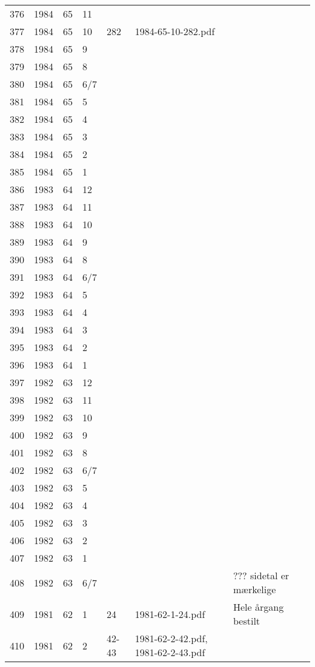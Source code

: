 \begin{longtable}{ |l|l|l|l|l|l|l| }
376 & 1984 & 65 & 11 &  &  &  \\
377 & 1984 & 65 & 10 & 282 & 1984-65-10-282.pdf &  \\
378 & 1984 & 65 & 9 &  &  &  \\
379 & 1984 & 65 & 8 &  &  &  \\
380 & 1984 & 65 & 6/7 &  &  &  \\
381 & 1984 & 65 & 5 &  &  &  \\
382 & 1984 & 65 & 4 &  &  &  \\
383 & 1984 & 65 & 3 &  &  &  \\
384 & 1984 & 65 & 2 &  &  &  \\
385 & 1984 & 65 & 1 &  &  &  \\
386 & 1983 & 64 & 12 &  &  &  \\
387 & 1983 & 64 & 11 &  &  &  \\
388 & 1983 & 64 & 10 &  &  &  \\
389 & 1983 & 64 & 9 &  &  &  \\
390 & 1983 & 64 & 8 &  &  &  \\
391 & 1983 & 64 & 6/7 &  &  &  \\
392 & 1983 & 64 & 5 &  &  &  \\
393 & 1983 & 64 & 4 &  &  &  \\
394 & 1983 & 64 & 3 &  &  &  \\
395 & 1983 & 64 & 2 &  &  &  \\
396 & 1983 & 64 & 1 &  &  &  \\
397 & 1982 & 63 & 12 &  &  &  \\
398 & 1982 & 63 & 11 &  &  &  \\
399 & 1982 & 63 & 10 &  &  &  \\
400 & 1982 & 63 & 9 &  &  &  \\
401 & 1982 & 63 & 8 &  &  &  \\
402 & 1982 & 63 & 6/7 &  &  &  \\
403 & 1982 & 63 & 5 &  &  &  \\
404 & 1982 & 63 & 4 &  &  &  \\
405 & 1982 & 63 & 3 &  &  &  \\
406 & 1982 & 63 & 2 &  &  &  \\
407 & 1982 & 63 & 1 &  &  &  \\
408 & 1982 & 63 & 6/7 &  &  & ??? sidetal er mærkelige \\
409 & 1981 & 62 & 1 & 24 & 1981-62-1-24.pdf & Hele årgang bestilt \\
410 & 1981 & 62 & 2 & 42-43 & 1981-62-2-42.pdf, 1981-62-2-43.pdf &  \\

\end{longtable}
